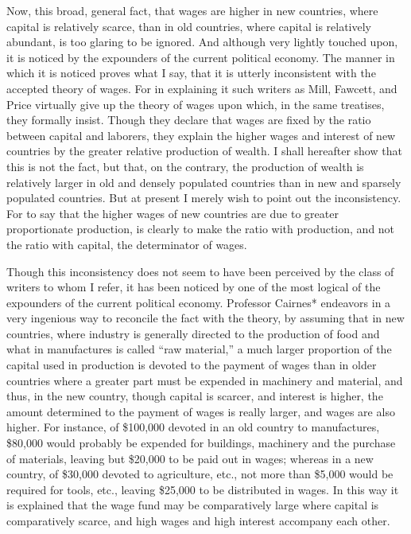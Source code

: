 Now, this broad, general fact, that wages are higher in new countries,
where capital is relatively scarce, than in old countries, where capital
is relatively abundant, is too glaring to be ignored. And although very
lightly touched upon, it is noticed by the expounders of the current
political economy. The manner in which it is noticed proves what I say,
that it is utterly inconsistent with the accepted theory of wages. For
in explaining it such writers as Mill, Fawcett, and Price virtually give
up the theory of wages upon which, in the same treatises, they formally
insist. Though they declare that wages are fixed by the ratio between
capital and laborers, they explain the higher wages and interest of new
countries by the greater relative production of wealth. I shall
hereafter show that this is not the fact, but that, on the contrary, the
production of wealth is relatively larger in old and densely populated
countries than in new and sparsely populated countries. But at present I
merely wish to point out the inconsistency. For to say that the higher
wages of new countries are due to greater proportionate production, is
clearly to make the ratio with production, and not the ratio with
capital, the determinator of wages.

Though this inconsistency does not seem to have been perceived by the
class of writers to whom I refer, it has been noticed by one of the most
logical of the expounders of the current political economy. Professor
Cairnes* endeavors in a very ingenious way to reconcile the fact with
the theory, by assuming that in new countries, where industry is
generally directed to the production of food and what in manufactures is
called ``raw material,'' a much larger proportion of the capital used in
production is devoted to the payment of wages than in older countries
where a greater part must be expended in machinery and material, and
thus, in the new country, though capital is scarcer, and interest is
higher, the amount determined to the payment of wages is really larger,
and wages are also higher. For instance, of \$100,000 devoted in an old
country to manufactures, \$80,000 would probably be expended for
buildings, machinery and the purchase of materials, leaving but \$20,000
to be paid out in wages; whereas in a new country, of \$30,000 devoted
to agriculture, etc., not more than \$5,000 would be required for tools,
etc., leaving \$25,000 to be distributed in wages. In this way it is
explained that the wage fund may be comparatively large where capital is
comparatively scarce, and high wages and high interest accompany each
other.

